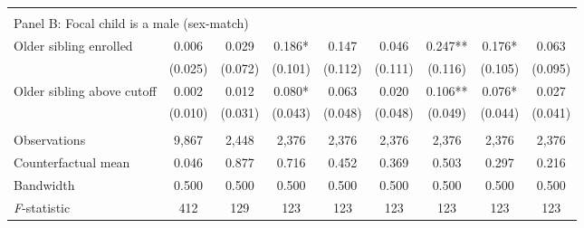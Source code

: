 {{\begin{tabular}{lcccccccc}
&  &  &  & & & & & \\
\multicolumn{10}{l}{Panel B: Focal child is a male (sex-match)} \\
Older sibling enrolled&       0.006   &       0.029   &       0.186*  &       0.147   &       0.046   &       0.247** &       0.176*  &       0.063   \\
                    &     (0.025)   &     (0.072)   &     (0.101)   &     (0.112)   &     (0.111)   &     (0.116)   &     (0.105)   &     (0.095)   \\
 
Older sibling above cutoff&       0.002   &       0.012   &       0.080*  &       0.063   &       0.020   &       0.106** &       0.076*  &       0.027   \\
                    &     (0.010)   &     (0.031)   &     (0.043)   &     (0.048)   &     (0.048)   &     (0.049)   &     (0.044)   &     (0.041)   \\
                    &               &               &               &               &               &               &               &               \\
Observations        &       9,867   &       2,448   &       2,376   &       2,376   &       2,376   &       2,376   &       2,376   &       2,376   \\
Counterfactual mean &       0.046   &       0.877   &       0.716   &       0.452   &       0.369   &       0.503   &       0.297   &       0.216   \\
Bandwidth           &       0.500   &       0.500   &       0.500   &       0.500   &       0.500   &       0.500   &       0.500   &       0.500   \\
\textit{F}-statistic&         412   &         129   &         123   &         123   &         123   &         123   &         123   &         123   \\
 

\bottomrule
\end{tabular}
}
}
